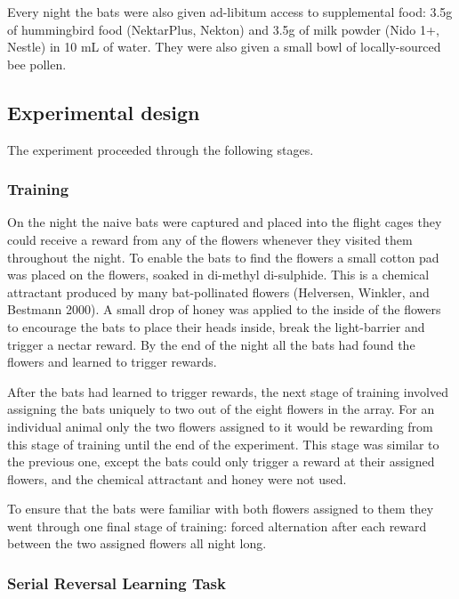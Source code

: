 \documentclass[
]{article}
\begin{document}
Every night the bats were also given ad-libitum access to supplemental food: 3.5g of hummingbird food (NektarPlus, Nekton) and 3.5g of milk powder (Nido 1+, Nestle) in 10 mL of water. They were also given a small bowl of locally-sourced bee pollen.

\hypertarget{experimental-design}{%
\subsection{Experimental design}\label{experimental-design}}

The experiment proceeded through the following stages.

\hypertarget{training}{%
\subsubsection{Training}\label{training}}

On the night the naive bats were captured and placed into the flight cages they could receive a reward from any of the flowers whenever they visited them throughout the night. To enable the bats to find the flowers a small cotton pad was placed on the flowers, soaked in di-methyl di-sulphide. This is a chemical attractant produced by many bat-pollinated flowers (Helversen, Winkler, and Bestmann 2000). A small drop of honey was applied to the inside of the flowers to encourage the bats to place their heads inside, break the light-barrier and trigger a nectar reward. By the end of the night all the bats had found the flowers and learned to trigger rewards.

After the bats had learned to trigger rewards, the next stage of training involved assigning the bats uniquely to two out of the eight flowers in the array. For an individual animal only the two flowers assigned to it would be rewarding from this stage of training until the end of the experiment. This stage was similar to the previous one, except the bats could only trigger a reward at their assigned flowers, and the chemical attractant and honey were not used.

To ensure that the bats were familiar with both flowers assigned to them they went through one final stage of training: forced alternation after each reward between the two assigned flowers all night long.

\hypertarget{serial-reversal-learning-task}{%
\subsubsection{Serial Reversal Learning Task}\label{serial-reversal-learning-task}}
\end{document}

